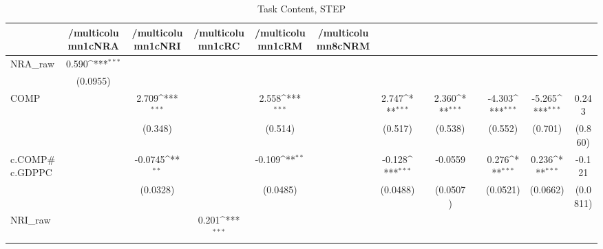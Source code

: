 \begin{table}[htbp]\centering
\def\sym#1{\ifmmode^{#1}\else\(^{#1}\)\fi}
\caption{Task Content, STEP}
\begin{tabular}{l*{12}{c}}
\hline\hline
            &/multicolumn{1}{c}{NRA}&/multicolumn{1}{c}{NRI}&/multicolumn{1}{c}{RC}&/multicolumn{1}{c}{RM}&/multicolumn{8}{c}{NRM}                                                                                                                                                        \\
\hline
NRA\_raw     &       0.590\sym{***}&                     &                     &                     &                     &                     &                     &                     &                     &                     &                     &                     \\
            &    (0.0955)         &                     &                     &                     &                     &                     &                     &                     &                     &                     &                     &                     \\
[1em]
COMP        &                     &       2.709\sym{***}&                     &       2.558\sym{***}&                     &       2.747\sym{***}&                     &       2.360\sym{***}&                     &      -4.303\sym{***}&      -5.265\sym{***}&       0.243         \\
            &                     &     (0.348)         &                     &     (0.514)         &                     &     (0.517)         &                     &     (0.538)         &                     &     (0.552)         &     (0.701)         &     (0.860)         \\
[1em]
c.COMP#c.GDPPC&                     &     -0.0745\sym{**} &                     &      -0.109\sym{**} &                     &      -0.128\sym{***}&                     &     -0.0559         &                     &       0.276\sym{***}&       0.236\sym{***}&      -0.121         \\
            &                     &    (0.0328)         &                     &    (0.0485)         &                     &    (0.0488)         &                     &    (0.0507)         &                     &    (0.0521)         &    (0.0662)         &    (0.0811)         \\
[1em]
NRI\_raw     &                     &                     &       0.201\sym{***}&                     &                     &                     &                     &                     &                     &                     &                     &                     \\

\end{tabular}
\end{table}
